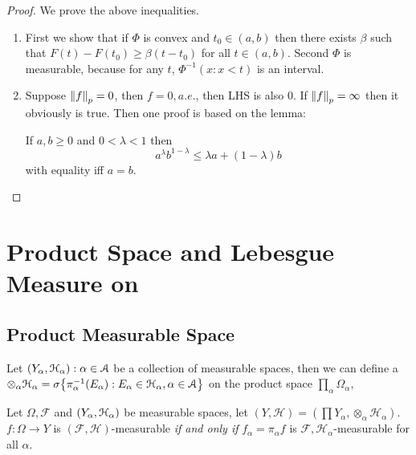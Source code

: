 \begin{proof}
    We prove the above inequalities. 
    \begin{enumerate}
        \item First we show that if \(\Phi\) is convex and \(t_{0}\in (a,b)\) then there exists \(\beta\) such that \(F(t) - F(t_{0}) \geq \beta(t-t_{0})\) for all \( t \in (a,b)\).  Second \(\Phi\) is measurable, because for any \(t\), \(\Phi^{-1} ({x: x < t})\) is an interval. 
            
        \item Suppose \(\norm{f}_{p} = 0\), then \(f = 0, a.e.\), then LHS is also \(0\). If \(\norm{f}_{p} = \infty\) then it obviously is true. Then one proof is based on the lemma:
        \begin{lemma}
            If \(a,b \geq 0\) and \(0 < \lambda <1\) then 
            \begin{equation*}
                a^{\lambda} b^{1-\lambda} \leq \lambda a +(1-\lambda) b
            \end{equation*}
            with equality iff \(a = b\). 
        \end{lemma}
    \end{enumerate}
\end{proof}


\section{Product Space and Lebesgue Measure on }

\subsection{Product Measurable Space}    

Let \(\pqty{Y_{\alpha}, \mathcal{H}_{\alpha}}: \alpha\in \mathcal{A} \) be a collection of measurable spaces, then we can define a  \(\otimes_{\alpha} \mathcal{H}_{\alpha} = \sigma\Bqty{\pi_{\alpha}^{-1} (E_{\alpha}): E_{\alpha} \in \mathcal{H}_{\alpha}, \alpha \in \mathcal{A}}\) on the product space \(\prod_{\alpha} \Omega_{\alpha}\),  
\begin{proposition}
    Let \(\Omega, \mathcal{F}\) and \(\pqty{Y_{\alpha}, \mathcal{H}_{\alpha}}\) be measurable spaces, let \((Y, \mathcal{H}) = (\prod Y_{\alpha}, \otimes_{\alpha} \mathcal{H}_{\alpha})\). \(f : \Omega \to Y\) is \((\mathcal{F}, \mathcal{H})\)-measurable \textit{if and only if} \(f_{\alpha} = \pi_{\alpha} f\) is \(\mathcal{F} ,\mathcal{H}_{\alpha}\)-measurable for all \(\alpha\).
\end{proposition} 

